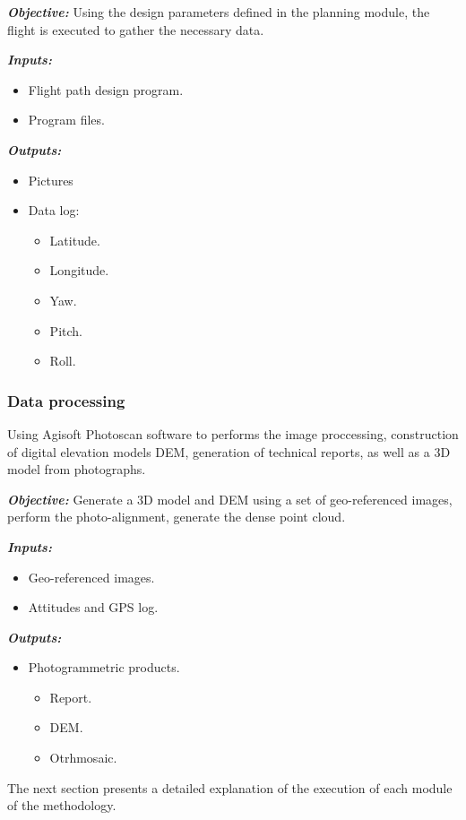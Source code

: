 \textit{\textbf{Objective:}} Using the design parameters defined in the planning module, the flight is executed to gather the necessary data.

\textit{\textbf{Inputs:}} 
\begin{itemize}
    \item Flight path design program.
    \item Program files.
\end{itemize}

\textit{\textbf{Outputs:}} 
\begin{itemize}
    \item Pictures
    \item Data log:\begin{itemize}
        \item Latitude.
        \item Longitude.
        \item Yaw.
        \item Pitch.
        \item Roll.
    \end{itemize}
\end{itemize}

\subsubsection{Data processing}
Using  Agisoft Photoscan software to performs the image proccessing, construction of digital elevation models DEM, generation of technical reports, as well as a 3D model from photographs.

\textit{\textbf{Objective:}} Generate a 3D model and DEM using a set of geo-referenced images, perform the photo-alignment, generate the dense point cloud.

\textit{\textbf{Inputs:}} 
\begin{itemize}
    \item Geo-referenced images.
    \item Attitudes and GPS log.
\end{itemize}

\textit{\textbf{Outputs:}} 
\begin{itemize}
    \item Photogrammetric products.
    \begin{itemize}
        \item Report.
        \item DEM.
        \item Otrhmosaic.
    \end{itemize}
\end{itemize}
The next section presents a detailed explanation of the execution of each module of the methodology.
